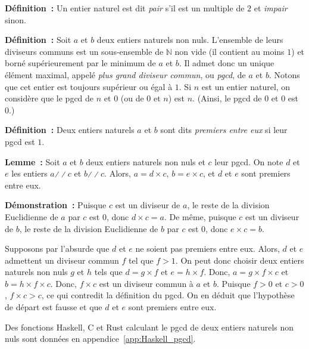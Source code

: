 \medskip

\noindent\textbf{Définition :} Un entier naturel est dit \textit{pair} s'il est un multiple de $2$ et \textit{impair} sinon. 

\medskip

\noindent\textbf{Définition :} Soit $a$ et $b$ deux entiers naturels non nuls. L'ensemble de leurs diviseurs communs est un sous-ensemble de $\mathbb{N}$ non vide (il contient au moins $1$) et borné supérieurement par le minimum de $a$ et $b$. Il admet donc un unique élément maximal, appelé \textit{plus grand diviseur commun}, ou \textit{pgcd}, de $a$ et $b$. 
    Notons que cet entier est toujours supérieur ou égal à $1$. 
    Si $n$ est un entier naturel, on considère que le pgcd de $n$ et $0$ (ou de $0$ et $n$) est $n$.
    (Ainsi, le pgcd de $0$ et $0$ est $0$.)

\medskip

\noindent\textbf{Définition :} Deux entiers naturels $a$ et $b$ sont dits \textit{premiers entre eux} si leur pgcd est $1$.

\medskip

\noindent\textbf{Lemme :} Soit $a$ et $b$ deux entiers naturels non nuls et $c$ leur pgcd.
    On note $d$ et $e$ les entiers $a \mathrel{\divslash\!\divslash} c$ et $b \mathrel{\divslash\!\divslash} c$. 
    Alors, $a = d \times c$, $b = e \times c$, et $d$ et $e$ sont premiers entre eux.

\medskip

\noindent\textbf{Démonstration :} 
    Puisque $c$ est un diviseur de $a$, le reste de la division Euclidienne de $a$ par $c$ est $0$, donc $d \times c = a$.
    De même, puisque $c$ est un diviseur de $b$, le reste de la division Euclidienne de $b$ par $c$ est $0$, donc $e \times c = b$.

    Supposons par l'absurde que $d$ et $e$ ne soient pas premiers entre eux. 
    Alors, $d$ et $e$ admettent un diviseur commun $f$ tel que $f > 1$.
    On peut donc choisir deux entiers naturels non nuls $g$ et $h$ tels que $d = g \times f$ et $e = h \times f$.
    Donc, $a = g \times f \times c$ et $b = h \times f \times c$. 
    Donc, $f \times c$ est un diviseur commun à $a$ et $b$. 
    Puisque $f > 0$ et $c > 0$, $f \times c > c$, ce qui contredit la définition du pgcd. 
    On en déduit que l'hypothèse de départ est fausse et que $d$ et $e$ sont premiers entre eux. 

   \done 

\medskip

Des fonctions Haskell, C et Rust calculant le pgcd de deux entiers naturels non nuls sont données en appendice~\ref{app:Haskell_pgcd}. 

